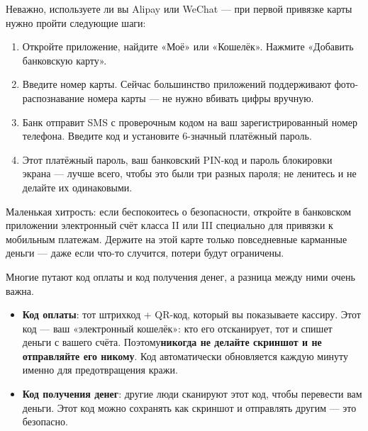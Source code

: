 


Неважно, используете ли вы Alipay или WeChat — при первой привязке карты нужно пройти следующие шаги:

\begin{enumerate}
  \item Откройте приложение, найдите «Моё» или «Кошелёк». Нажмите «Добавить банковскую карту».
  \item Введите номер карты. Сейчас большинство приложений поддерживают фото-распознавание номера карты — не нужно вбивать цифры вручную.
  \item Банк отправит SMS с проверочным кодом на ваш зарегистрированный номер телефона. Введите код и установите 6-значный платёжный пароль.
  \item Этот платёжный пароль, ваш банковский PIN-код и пароль блокировки экрана — лучше всего, чтобы это были три разных пароля; не ленитесь и не делайте их одинаковыми.
\end{enumerate}

Маленькая хитрость: если беспокоитесь о безопасности, откройте в банковском приложении электронный счёт класса II или III специально для привязки к мобильным платежам. Держите на этой карте только повседневные карманные деньги — даже если что-то случится, потери будут ограничены.


Многие путают код оплаты и код получения денег, а разница между ними очень важна.

\begin{itemize}
  \item \textbf{Код оплаты}: тот штрихкод + QR-код, который вы показываете кассиру. Этот код — ваш «электронный кошелёк»: кто его отсканирует, тот и спишет деньги с вашего счёта. Поэтому\textbf{никогда не делайте скриншот и не отправляйте его никому}. Код автоматически обновляется каждую минуту именно для предотвращения кражи.
  \item \textbf{Код получения денег}: другие люди сканируют этот код, чтобы перевести вам деньги. Этот код можно сохранять как скриншот и отправлять другим — это безопасно.
\end{itemize}

